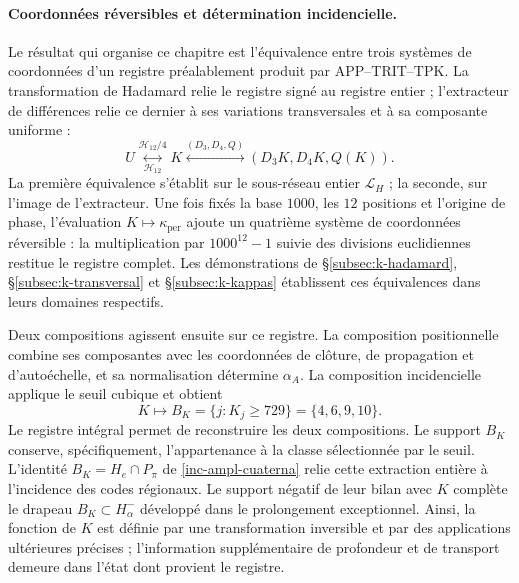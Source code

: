 \paragraph{Coordonnées réversibles et détermination incidencielle.}
\label{ampl-alfa-k-intro-reversible}
Le résultat qui organise ce chapitre est l'équivalence entre trois
systèmes de coordonnées d'un registre préalablement produit par
APP--TRIT--TPK. La transformation de Hadamard relie le registre
signé au registre entier ; l'extracteur de différences relie
ce dernier à ses variations transversales et à sa composante uniforme :
\[
 U\underset{\mathcal H_{12}}{\overset{\mathcal H_{12}/4}{\longleftrightarrow}}K
 \overset{(D_3,D_4,Q)}{\longleftrightarrow}
 (D_3K,D_4K,Q(K)).
\]
La première équivalence s'établit sur le sous-réseau entier
$\mathcal L_H$ ; la seconde, sur l'image de l'extracteur. Une fois fixés la
base $1000$, les $12$ positions et l'origine de phase, l'évaluation
$K\mapsto\kappa_{\mathrm{per}}$ ajoute un quatrième système de coordonnées
réversible : la multiplication par $1000^{12}-1$ suivie des divisions
euclidiennes restitue le registre complet. Les démonstrations de
\S\ref{subsec:k-hadamard}, \S\ref{subsec:k-transversal} et
\S\ref{subsec:k-kappas} établissent ces équivalences dans leurs domaines
respectifs.

Deux compositions agissent ensuite sur ce registre. La composition
positionnelle combine ses composantes avec les coordonnées de clôture,
de propagation et d'autoéchelle, et sa normalisation détermine $\alpha_A$. La
composition incidencielle applique le seuil cubique et obtient
\[
 K\longmapsto B_K=\{j:K_j\geq729\}=\{4,6,9,10\}.
\]
Le registre intégral permet de reconstruire les deux compositions. Le support
$B_K$ conserve, spécifiquement, l'appartenance à la classe sélectionnée
par le seuil. L'identité $B_K=H_e\cap P_\pi$ de
\eqref{inc-ampl-cuaterna} relie cette extraction entière à l'incidence
des codes régionaux. Le support négatif de leur bilan avec $K$
complète le drapeau $B_K\subset H^-_\alpha$ développé dans le
prolongement exceptionnel. Ainsi, la fonction de $K$ est définie par
une transformation inversible et par des applications ultérieures
précises ; l'information supplémentaire de profondeur et de transport demeure
dans l'état dont provient le registre.
